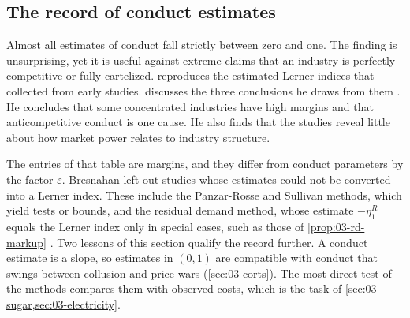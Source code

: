 \subsection{The record of conduct estimates}\label{sec:03-record}

Almost all estimates of conduct fall strictly between zero and one. The finding is unsurprising, yet it is useful against
extreme claims that an industry is perfectly competitive or fully cartelized.  reproduces the
estimated Lerner indices that \citet[Table~17.1]{Bresnahan1989} collected from early studies. 
discusses the three conclusions he draws from them \citep[pp.~1052--1053]{Bresnahan1989}. He concludes that some
concentrated industries have high margins and that anticompetitive conduct is one cause. He also finds that the studies
reveal little about how market power relates to industry structure.

The entries of that table are margins, and they differ from conduct parameters by the factor $\varepsilon$. Bresnahan left
out studies whose estimates could not be converted into a Lerner index. These include the Panzar-Rosse and Sullivan
methods, which yield tests or bounds, and the residual demand method, whose estimate $-\eta^R_1$ equals the Lerner index
only in special cases, such as those of \cref{prop:03-rd-markup} \citep[fn.~47]{Bresnahan1989}. Two lessons of this section qualify the record further. A conduct estimate is
a slope, so estimates in $(0, 1)$ are compatible with conduct that swings between collusion and price wars
(\cref{sec:03-corts}). The most direct test of the methods compares them with observed costs, which is the task of
\cref{sec:03-sugar,sec:03-electricity}.
